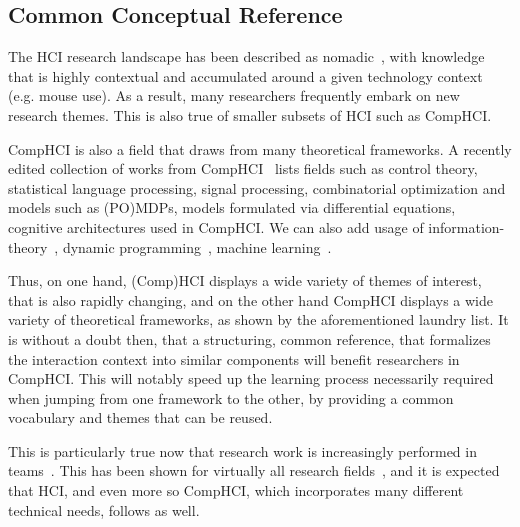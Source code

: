 \documentclass[12pt,a4paper]{article}
\begin{document}
\subsection{Common Conceptual Reference}
The HCI research landscape has been described as nomadic~\cite{liu2014}, with knowledge that is highly contextual and accumulated around a given technology context (e.g. mouse use). As a result, many researchers frequently embark on new research themes. This is also true of smaller subsets of HCI such as CompHCI.


CompHCI is also a field that draws from many theoretical frameworks. A recently edited collection of works from CompHCI~\cite{oulasvirta2016} lists fields such as control theory, statistical language processing, signal processing, combinatorial optimization and models such as (PO)MDPs, models formulated via differential equations, cognitive architectures used in CompHCI. We can also add usage of information-theory~\cite{gori2020, liu2017, liu2018}, dynamic programming~\cite{jokinen2021, chen2021}, machine learning~\cite{todi2021}. 

Thus, on one hand, (Comp)HCI displays a wide variety of themes of interest, that is also rapidly changing, and on the other hand CompHCI displays a wide variety of theoretical frameworks, as shown by the aforementioned laundry list.
It is without a doubt then, that a structuring, common reference, that formalizes the interaction context into similar components will benefit researchers in CompHCI.
This will notably speed up the learning process necessarily required when jumping from one framework to the other, by providing a common vocabulary and themes that can be reused.


This is particularly true now that research work is increasingly performed in teams~\cite{bennett2013}. This has been shown for virtually all research fields~\cite{wuchty2007}, and it is expected that HCI, and even more so CompHCI, which incorporates many different technical needs, follows as well.
\end{document}
